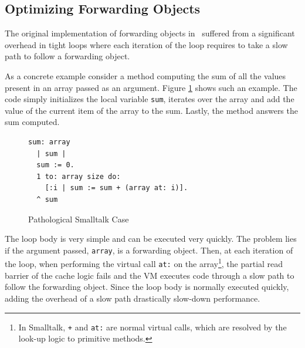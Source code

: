 \documentclass[sigplan,10pt,review,anonymous]{acmart}\settopmatter{printfolios=true,printccs=false,printacmref=false}
\begin{document}
\subsection{Optimizing Forwarding Objects}

The original implementation of forwarding objects in~\cite{Forwarders} suffered from a significant overhead in
tight loops where each iteration of the loop requires to take a slow path to follow a forwarding object.


As a concrete example consider a method computing the sum of all the values present in an array passed as an argument. Figure \ref{fig:code} shows such an example. The code simply initializes the local variable \texttt{sum}, iterates over the array and add the value of the current item of the array to the sum. Lastly, the method answers the sum computed. 

\begin{figure}[bth]
		\vspace{-0.1cm}
\begin{verbatim}
sum: array
  | sum |
  sum := 0.
  1 to: array size do: 
    [:i | sum := sum + (array at: i)].
  ^ sum
\end{verbatim}
		\vspace{-0.3cm}
		\caption{Pathological Smalltalk Case\vspace{-0.3cm}}
		\label{fig:code}
 \end{figure}

The loop body is very simple and can be executed very quickly. The problem lies if the argument passed, \texttt{array}, is a forwarding object. Then, at each iteration of the loop, when performing the virtual call \texttt{at:} on the array\footnote{In Smalltalk, \texttt{+} and \texttt{at:} are normal virtual calls, which are resolved by the look-up logic to primitive methods.}, the partial read barrier of the cache logic fails and the VM executes code through a slow path to follow the forwarding object. Since the loop body is normally executed quickly, adding the overhead of a slow path drastically slow-down performance. 
\end{document}
